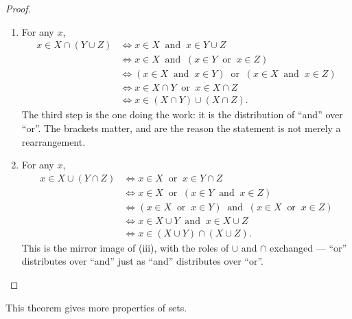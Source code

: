 \documentclass[11pt,a4paper]{article}
\theoremstyle{definition}
\begin{document}
\begin{proof}
\begin{enumerate}
\item[iii.] For any $x$,
\begin{align*}
x\in X\cap (Y\cup Z) &\iff x\in X \ \text{ and }\ x\in Y\cup Z\\
                     &\iff x\in X \ \text{ and }\ (x\in Y \ \text{ or }\ x\in Z)\\
                     &\iff (x\in X \ \text{ and }\ x\in Y) \ \text{ or }\ (x\in X \ \text{ and }\ x\in Z)\\
                     &\iff x\in X\cap Y \ \text{ or }\ x\in X\cap Z\\
                     &\iff x\in (X\cap Y)\cup (X\cap Z).
\end{align*}
The third step is the one doing the work: it is the distribution of ``and''
over ``or''. The brackets matter, and are the reason the statement is not
merely a rearrangement.

\item[iv.] For any $x$,
\begin{align*}
x\in X\cup (Y\cap Z) &\iff x\in X \ \text{ or }\ x\in Y\cap Z\\
                     &\iff x\in X \ \text{ or }\ (x\in Y \ \text{ and }\ x\in Z)\\
                     &\iff (x\in X \ \text{ or }\ x\in Y) \ \text{ and }\ (x\in X \ \text{ or }\ x\in Z)\\
                     &\iff x\in X\cup Y \ \text{ and }\ x\in X\cup Z\\
                     &\iff x\in (X\cup Y)\cap (X\cup Z).
\end{align*}
This is the mirror image of (iii), with the roles of $\cup$ and $\cap$
exchanged --- ``or'' distributes over ``and'' just as ``and'' distributes over
``or''.
\end{enumerate}
\end{proof}
This theorem gives more properties of sets.
\end{document}
